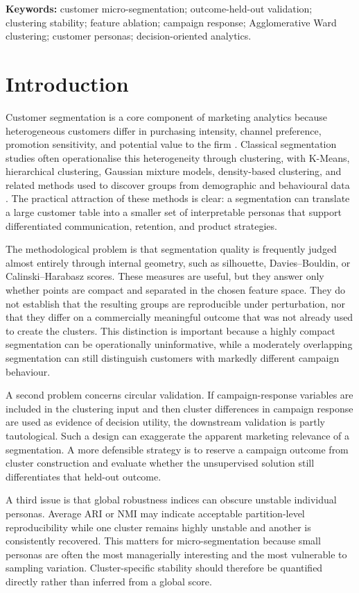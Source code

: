 \documentclass[10pt]{article}
\begin{document}
\textbf{Keywords:} customer micro-segmentation; outcome-held-out validation; clustering stability; feature ablation; campaign response; Agglomerative Ward clustering; customer personas; decision-oriented analytics.

\section{Introduction}
Customer segmentation is a core component of marketing analytics because heterogeneous customers differ in purchasing intensity, channel preference, promotion sensitivity, and potential value to the firm \cite{ref6,ref7}. Classical segmentation studies often operationalise this heterogeneity through clustering, with K-Means, hierarchical clustering, Gaussian mixture models, density-based clustering, and related methods used to discover groups from demographic and behavioural data \cite{ref3,ref4,ref12}. The practical attraction of these methods is clear: a segmentation can translate a large customer table into a smaller set of interpretable personas that support differentiated communication, retention, and product strategies.

The methodological problem is that segmentation quality is frequently judged almost entirely through internal geometry, such as silhouette, Davies--Bouldin, or Calinski--Harabasz scores. These measures are useful, but they answer only whether points are compact and separated in the chosen feature space. They do not establish that the resulting groups are reproducible under perturbation, nor that they differ on a commercially meaningful outcome that was not already used to create the clusters. This distinction is important because a highly compact segmentation can be operationally uninformative, while a moderately overlapping segmentation can still distinguish customers with markedly different campaign behaviour.

A second problem concerns circular validation. If campaign-response variables are included in the clustering input and then cluster differences in campaign response are used as evidence of decision utility, the downstream validation is partly tautological. Such a design can exaggerate the apparent marketing relevance of a segmentation. A more defensible strategy is to reserve a campaign outcome from cluster construction and evaluate whether the unsupervised solution still differentiates that held-out outcome.

A third issue is that global robustness indices can obscure unstable individual personas. Average ARI or NMI may indicate acceptable partition-level reproducibility while one cluster remains highly unstable and another is consistently recovered. This matters for micro-segmentation because small personas are often the most managerially interesting and the most vulnerable to sampling variation. Cluster-specific stability should therefore be quantified directly rather than inferred from a global score.
\end{document}
